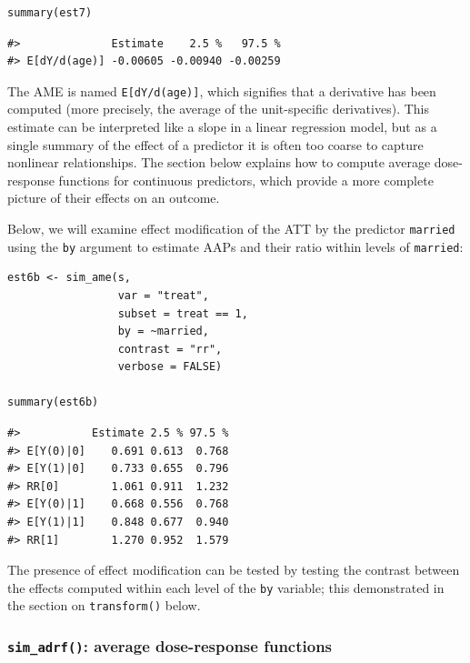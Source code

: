 \begin{verbatim}
summary(est7)
\end{verbatim}

\begin{verbatim}
#>              Estimate    2.5 %   97.5 %
#> E[dY/d(age)] -0.00605 -0.00940 -0.00259
\end{verbatim}

The AME is named \texttt{E{[}dY/d(age){]}}, which signifies that a derivative has been computed (more precisely, the average of the unit-specific derivatives). This estimate can be interpreted like a slope in a linear regression model, but as a single summary of the effect of a predictor it is often too coarse to capture nonlinear relationships. The section below explains how to compute average dose-response functions for continuous predictors, which provide a more complete picture of their effects on an outcome.

Below, we will examine effect modification of the ATT by the predictor \texttt{married} using the \texttt{by} argument to estimate AAPs and their ratio within levels of \texttt{married}:

\begin{verbatim}
est6b <- sim_ame(s,
                 var = "treat",
                 subset = treat == 1,
                 by = ~married,
                 contrast = "rr",
                 verbose = FALSE)

summary(est6b)
\end{verbatim}

\begin{verbatim}
#>           Estimate 2.5 % 97.5 %
#> E[Y(0)|0]    0.691 0.613  0.768
#> E[Y(1)|0]    0.733 0.655  0.796
#> RR[0]        1.061 0.911  1.232
#> E[Y(0)|1]    0.668 0.556  0.768
#> E[Y(1)|1]    0.848 0.677  0.940
#> RR[1]        1.270 0.952  1.579
\end{verbatim}

The presence of effect modification can be tested by testing the contrast between the effects computed within each level of the \texttt{by} variable; this demonstrated in the section on \texttt{transform()} below.

\hypertarget{sim_adrf-average-dose-response-functions}{%
\subsubsection{\texorpdfstring{\texttt{sim\_adrf()}: average dose-response functions}{sim\_adrf(): average dose-response functions}}\label{sim_adrf-average-dose-response-functions}}

